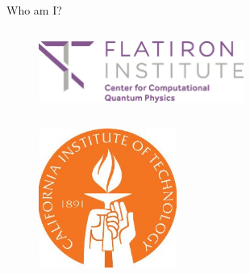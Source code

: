 \begin{frame}{Who am I?}
\begin{columns}
\begin{column}[T]{0.3\textwidth}
\begin{figure}[T]
    \end{figure}

    \begin{figure}

      \centering
      \includegraphics[width=0.6\textwidth]{
        slides/assets/whoam-i-flatiron-institute-ccq.jpg
      }

    \end{figure}

    \begin{columns}

      \begin{column}[T, onlytextwidth]{0.5\textwidth}%

        \begin{figure}

          \includegraphics[width=0.6\textwidth]{
            slides/assets/who-am-i-caltech.jpg
          }

        \end{figure}

      \end{column}

      \begin{column}[T, onlytextwidth]{0.5\textwidth}%

        \begin{figure}


\end{figure}
\end{column}
\end{columns}
\end{column}
\end{columns}
\end{frame}
